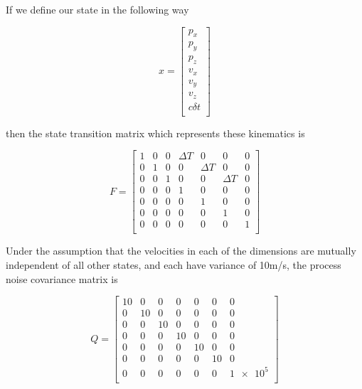 \documentclass[11pt]{article}
\begin{document}
\begin{enumerate}
{If we define our state in the following way

\[
   x =
  \left[ {\begin{array}{c}
   p_x \\
   p_y \\
   p_z \\
   v_x \\
   v_y \\
   v_z \\
   c \delta t \\
  \end{array} } \right]
  
\]

then the state transition matrix which represents these kinematics is

\[
   F =
   \left[ {\begin{array}{ccccccc}
    1 & 0 & 0 & \Delta T & 0 & 0 & 0 \\
    0 & 1 & 0 & 0 & \Delta T & 0 & 0 \\
    0 & 0 & 1 & 0 & 0 & \Delta T & 0 \\
    0 & 0 & 0 & 1 & 0 & 0 & 0 \\
    0 & 0 & 0 & 0 & 1 & 0 & 0 \\
    0 & 0 & 0 & 0 & 0 & 1 & 0 \\
    0 & 0 & 0 & 0 & 0 & 0 & 1 \\
  \end{array} } \right]
  
\]

Under the assumption that the velocities in each of the dimensions are mutually independent of all other states, and each have variance of 10m/s, the process noise covariance matrix is

\[
   Q =
   \left[ {\begin{array}{ccccccc}
    10 & 0 & 0 & 0 & 0 & 0 & 0 \\
    0 & 10 & 0 & 0 & 0 & 0 & 0 \\
    0 & 0 & 10 & 0 & 0 & 0 & 0 \\
    0 & 0 & 0 & 10 & 0 & 0 & 0 \\
    0 & 0 & 0 & 0 & 10 & 0 & 0 \\
    0 & 0 & 0 & 0 & 0 & 10 & 0 \\
    0 & 0 & 0 & 0 & 0 & 0 & \num{1e5} \\
  \end{array} } \right]
  
\]

}

\end{enumerate}
\end{document}
